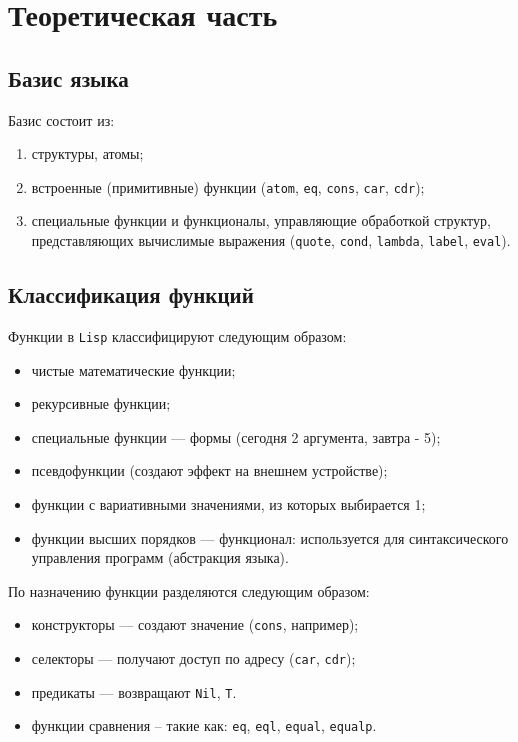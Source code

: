 \chapter{Теоретическая часть}
\section{Базис языка}

Базис состоит из:
\begin{enumerate}
	\item структуры, атомы;
	\item встроенные (примитивные) функции (\texttt{atom}, \texttt{eq}, \texttt{cons}, \texttt{car}, \texttt{cdr});
	\item специальные функции и функционалы, управляющие обработкой структур, представляющих вычислимые выражения (\texttt{quote}, \texttt{cond}, \texttt{lambda}, \texttt{label}, \texttt{eval}).
\end{enumerate}

\section{Классификация функций}

Функции в \texttt{Lisp} классифицируют следующим образом:

\begin{itemize}
	\item чистые математические функции;
	\item рекурсивные функции;
	\item специальные функции --- формы (сегодня 2 аргумента, завтра - 5);
	\item псевдофункции (создают эффект на внешнем устройстве);
	\item функции с вариативными значениями, из которых выбирается 1;
	\item функции высших порядков --- функционал: используется для синтаксического управления программ (абстракция языка).
\end{itemize}

По назначению функции разделяются следующим образом:

\begin{itemize}
	\item конструкторы --- создают значение (\texttt{cons}, например);
	\item селекторы --- получают доступ по адресу (\texttt{car}, \texttt{cdr});
	\item предикаты --- возвращают \texttt{Nil}, \texttt{T}.
	\item функции сравнения -- такие как: \texttt{eq}, \texttt{eql}, \texttt{equal}, \texttt{equalp}.
\end{itemize}

